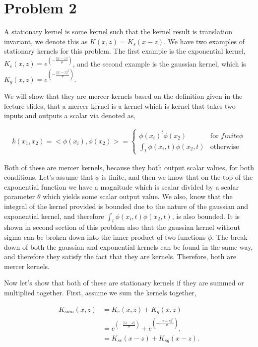 \documentclass[paper=a4, fontsize=11pt]{scrartcl} %
\begin{document}
\section{Problem 2}

A stationary kernel is some kernel such that the kernel result is translation invariant, we denote this as $K(x,z) = K_s(x-z)$.  We have two examples of stationary kernels for this problem.  The first example is the exponential kernel, $K_e(x,z) = e^{(-\frac{||x-z||}{\theta})}$, and the second example is the gaussian kernel, which is $K_g(x,z) = e^{(-\frac{||x-z||^2}{\theta})}$.

We will show that they are mercer kernels based on the definition given in the lecture slides, that a mercer kernel is a kernel which is kernel that takes two inputs and outputs a scalar via denoted as,

\begin{align}
k(x_1,x_2) = <\phi(x_i),\phi(x_2)> = \left\{
	\begin{array}{ll}
		\phi(x_i)^t\phi(x_2) & \mbox{for } finite \phi \\
		\int_t \phi(x_i,t)\phi(x_2,t) & \mbox{otherwise} 
	\end{array}
\right.
\end{align} 

Both of these are mercer kernels, because they both output scalar values, for both conditions.
Let's assume that $\phi$ is finite, and then we know that on the top of the exponential function we have a magnitude which is scalar divided by a scalar parameter $\theta$ which yields some scalar output value.
We also, know that the integral of the kernel provided is bounded due to the nature of the gaussian and exponential kernel, and therefore $\int_t \phi(x_i,t)\phi(x_2,t)$, is also bounded.  
It is shown in second section of this problem also that the gaussian kernel without sigma can be broken down into the inner product of two functions $\phi$.
The break down of both the gaussian and exponential kernels can be found in the same way, and therefore they satisfy the fact that they are kernels.
Therefore, both are mercer kernels.

Now let's show that both of these are stationary kernels if they are summed or multiplied together.  
First, assume we sum the kernels together,

\begin{align}
K_{sum}(x,z) &= K_e(x,z)+K_g(x,z) \\
&= e^{(-\frac{||x-z||}{\theta})} + e^{(-\frac{||x-z||^2}{\theta})}, \\
&= K_{se}(x-z) + K_{sg}(x-z). \\
\end{align}
\end{document}
